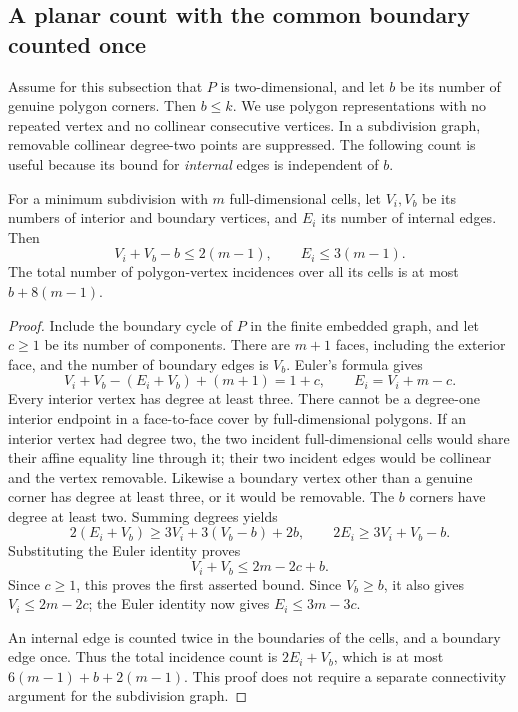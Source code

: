 \subsection{A planar count with the common boundary counted once}
\label{pl:counting}

Assume for this subsection that \(P\) is two-dimensional, and let
\(b\) be its number of genuine polygon corners.  Then \(b\leq k\).
We use polygon representations with no repeated vertex and no
collinear consecutive vertices.  In a subdivision graph, removable
collinear degree-two points are suppressed.  The following count is
useful because its bound for \emph{internal} edges is independent
of \(b\).

\begin{lemma}
\label{pl:euler}
For a minimum subdivision with \(m\) full-dimensional cells,
let \(V_i,V_b\) be its numbers of interior and boundary vertices,
and \(E_i\) its number of internal edges.  Then
\begin{equation}
 V_i+V_b-b\leq2(m-1),\qquad
 E_i\leq3(m-1).
 \label{pl:euler-bounds}
\end{equation}
The total number of polygon-vertex incidences over all its cells
is at most \(b+8(m-1)\).
\end{lemma}
\begin{proof}
Include the boundary cycle of \(P\) in the finite embedded graph,
and let \(c\geq1\) be its number of components.
There are \(m+1\) faces, including the exterior face, and
the number of boundary edges is \(V_b\).
Euler's formula gives
\[
 V_i+V_b-(E_i+V_b)+(m+1)=1+c,
 \qquad E_i=V_i+m-c.
\]
Every interior vertex has degree at least three.
There cannot be a degree-one interior endpoint in a face-to-face
cover by full-dimensional polygons.  If an interior vertex had
degree two, the two incident full-dimensional cells would share
their affine equality line through it; their two incident edges
would be collinear and the vertex removable.
Likewise a boundary vertex other than a genuine corner has degree
at least three, or it would be removable.
The \(b\) corners have degree at least two.  Summing degrees yields
\[
 2(E_i+V_b)\geq3V_i+3(V_b-b)+2b,
 \qquad
 2E_i\geq3V_i+V_b-b.
\]
Substituting the Euler identity proves
\[
 V_i+V_b\leq2m-2c+b.
\]
Since \(c\geq1\), this proves the first asserted bound.
Since \(V_b\geq b\), it also gives \(V_i\leq2m-2c\);
the Euler identity now gives \(E_i\leq3m-3c\).

An internal edge is counted twice in the boundaries of the cells,
and a boundary edge once.  Thus the total incidence count is
\(2E_i+V_b\), which is at most
\(6(m-1)+b+2(m-1)\).
This proof does not require a separate connectivity argument
for the subdivision graph.
\end{proof}

